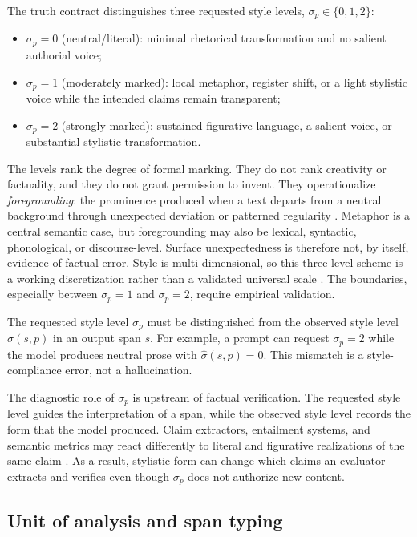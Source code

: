 \documentclass{clv2025}
\begin{document}
The truth contract distinguishes three requested style levels, $\sigma_p\in\{0,1,2\}$:
\begin{itemize}
  \item $\sigma_p=0$ (neutral/literal): minimal rhetorical transformation and no salient authorial voice;
  \item $\sigma_p=1$ (moderately marked): local metaphor, register shift, or a light stylistic voice while the intended claims remain transparent;
  \item $\sigma_p=2$ (strongly marked): sustained figurative language, a salient voice, or substantial stylistic transformation.
\end{itemize}
The levels rank the degree of formal marking.
They do not rank creativity or factuality, and they do not grant permission to invent.
They operationalize \emph{foregrounding}: the prominence produced when a text departs from a neutral background through unexpected deviation or patterned regularity \citep{leech_short_style_1981,vanpeer_stylistics_2020}.
Metaphor is a central semantic case, but foregrounding may also be lexical, syntactic, phonological, or discourse-level.
Surface unexpectedness is therefore not, by itself, evidence of factual error.
Style is multi-dimensional, so this three-level scheme is a working discretization rather than a validated universal scale \citep{kang_style_2021,jin_deep_2022}.
The boundaries, especially between $\sigma_p=1$ and $\sigma_p=2$, require empirical validation.

The requested style level $\sigma_p$ must be distinguished from the observed style level $\widehat\sigma(s,p)$ in an output span $s$.
For example, a prompt can request $\sigma_p=2$ while the model produces neutral prose with $\widehat\sigma(s,p)=0$.
This mismatch is a style-compliance error, not a hallucination.

The diagnostic role of $\sigma_p$ is upstream of factual verification.
The requested style level guides the interpretation of a span, while the observed style level records the form that the model produced.
Claim extractors, entailment systems, and semantic metrics may react differently to literal and figurative realizations of the same claim \citep{chen_menli_2023,aynetdinov_semscore_2024,lai_multidimensional_2023,pauli_mind_2025}.
As a result, stylistic form can change which claims an evaluator extracts and verifies even though $\sigma_p$ does not authorize new content.

\subsection{Unit of analysis and span typing}
\end{document}
